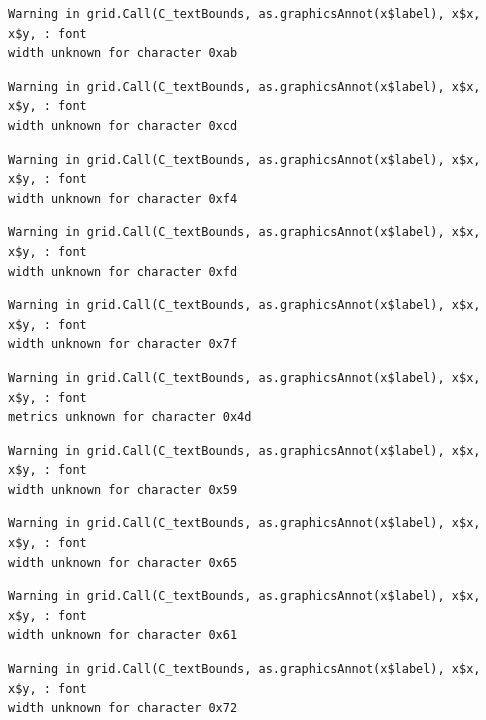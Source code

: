 \documentclass[
  letterpaper,
  DIV=11,
  numbers=noendperiod]{scrreprt}
\begin{document}
\begin{verbatim}
Warning in grid.Call(C_textBounds, as.graphicsAnnot(x$label), x$x, x$y, : font
width unknown for character 0xab
\end{verbatim}

\begin{verbatim}
Warning in grid.Call(C_textBounds, as.graphicsAnnot(x$label), x$x, x$y, : font
width unknown for character 0xcd
\end{verbatim}

\begin{verbatim}
Warning in grid.Call(C_textBounds, as.graphicsAnnot(x$label), x$x, x$y, : font
width unknown for character 0xf4
\end{verbatim}

\begin{verbatim}
Warning in grid.Call(C_textBounds, as.graphicsAnnot(x$label), x$x, x$y, : font
width unknown for character 0xfd
\end{verbatim}

\begin{verbatim}
Warning in grid.Call(C_textBounds, as.graphicsAnnot(x$label), x$x, x$y, : font
width unknown for character 0x7f
\end{verbatim}

\begin{verbatim}
Warning in grid.Call(C_textBounds, as.graphicsAnnot(x$label), x$x, x$y, : font
metrics unknown for character 0x4d
\end{verbatim}

\begin{verbatim}
Warning in grid.Call(C_textBounds, as.graphicsAnnot(x$label), x$x, x$y, : font
width unknown for character 0x59
\end{verbatim}

\begin{verbatim}
Warning in grid.Call(C_textBounds, as.graphicsAnnot(x$label), x$x, x$y, : font
width unknown for character 0x65
\end{verbatim}

\begin{verbatim}
Warning in grid.Call(C_textBounds, as.graphicsAnnot(x$label), x$x, x$y, : font
width unknown for character 0x61
\end{verbatim}

\begin{verbatim}
Warning in grid.Call(C_textBounds, as.graphicsAnnot(x$label), x$x, x$y, : font
width unknown for character 0x72
\end{verbatim}
\end{document}
